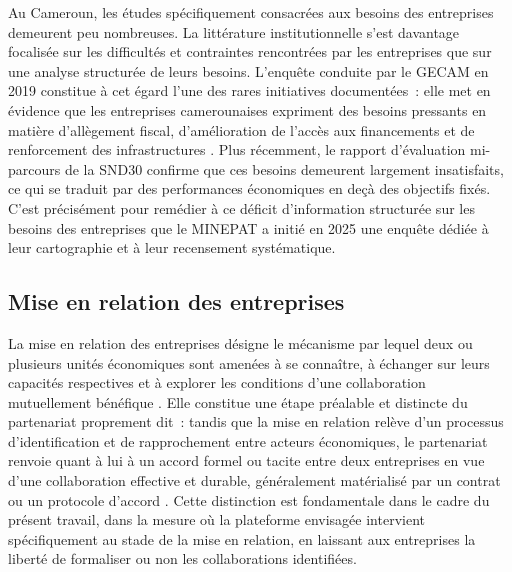 \documentclass[]{article}
\begin{document}
	Au Cameroun, les études spécifiquement consacrées aux besoins des entreprises demeurent
	peu nombreuses. La littérature institutionnelle s'est davantage focalisée sur les
	difficultés et contraintes rencontrées par les entreprises que sur une analyse
	structurée de leurs besoins. L'enquête conduite par le GECAM en 2019 constitue à cet
	égard l'une des rares initiatives documentées~: elle met en évidence que les
	entreprises camerounaises expriment des besoins pressants en matière d'allègement
	fiscal, d'amélioration de l'accès aux financements et de renforcement des
	infrastructures \citep{barometr_gecam}. Plus récemment, le rapport d'évaluation
	mi-parcours de la SND30 \citep{minepat_midterm_2026} confirme que ces besoins
	demeurent largement insatisfaits, ce qui se traduit par des performances économiques
	en deçà des objectifs fixés. C'est précisément pour remédier à ce déficit
	d'information structurée sur les besoins des entreprises que le MINEPAT a
	initié en 2025 une enquête dédiée à leur cartographie et à leur recensement
	systématique.
	
	\subsection{Mise en relation des entreprises}
	
	La mise en relation des entreprises désigne le mécanisme par lequel deux ou plusieurs
	unités économiques sont amenées à se connaître, à échanger sur leurs capacités
	respectives et à explorer les conditions d'une collaboration mutuellement bénéfique
	\citep{oecd_sme_2021}. Elle constitue une étape préalable et distincte du partenariat
	proprement dit~: tandis que la mise en relation relève d'un processus d'identification
	et de rapprochement entre acteurs économiques, le partenariat renvoie quant à lui à
	un accord formel ou tacite entre deux entreprises en vue d'une collaboration effective
	et durable, généralement matérialisé par un contrat ou un protocole d'accord
	\citep{williamson_1985}. Cette distinction est fondamentale dans le cadre du présent
	travail, dans la mesure où la plateforme envisagée intervient spécifiquement au
	stade de la mise en relation, en laissant aux entreprises la liberté de formaliser ou
	non les collaborations identifiées.
	
\end{document}
